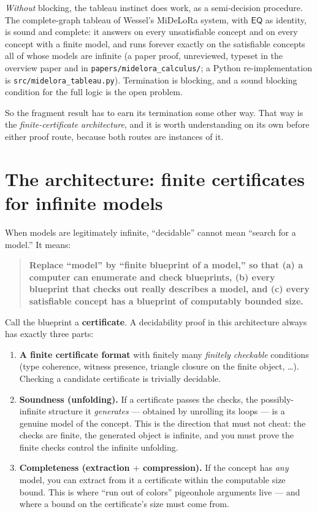 \documentclass[11pt]{article}
\newcommand{\EQ}{\ensuremath{\mathsf{EQ}}}
\newcommand{\code}[1]{\texttt{#1}}
\begin{document}
\emph{Without} blocking, the tableau instinct does work, as a semi-decision
procedure. The complete-graph tableau of Wessel's MiDeLoRa system, with $\EQ$
as identity, is sound and complete: it answers on every unsatisfiable concept
and on every concept with a finite model, and runs forever exactly on the
satisfiable concepts all of whose models are infinite (a paper proof,
unreviewed, typeset in the overview paper and in
\code{papers/midelora\_calculus/}; a Python re-implementation is
\code{src/midelora\_tableau.py}). Termination is blocking, and a sound
blocking condition for the full logic is the open problem.

So the fragment result has to earn its termination some other way. That
way is the \emph{finite-certificate architecture}, and it is worth
understanding on its own before either proof route, because both routes
are instances of it.

\section{The architecture: finite certificates for infinite
models}\label{sec:architecture}

When models are legitimately infinite, ``decidable'' cannot mean
``search for a model.'' It means:

\begin{quote}
\textbf{Replace ``model'' by ``finite blueprint of a model,'' so that
(a) a computer can enumerate and check blueprints, (b) every blueprint
that checks out really describes a model, and (c) every satisfiable
concept has a blueprint of computably bounded size.}
\end{quote}

Call the blueprint a \textbf{certificate}. A decidability proof in this
architecture always has exactly three parts:
\begin{enumerate}
\item \textbf{A finite certificate format} with finitely many
  \emph{finitely checkable} conditions (type coherence, witness
  presence, triangle closure on the finite object, \dots). Checking a
  candidate certificate is trivially decidable.
\item \textbf{Soundness (unfolding).} If a certificate passes the
  checks, the possibly-infinite structure it \emph{generates} ---
  obtained by unrolling its loops --- is a genuine model of the
  concept. This is the direction that must not cheat: the checks are
  finite, the generated object is infinite, and you must prove the
  finite checks control the infinite unfolding.
\item \textbf{Completeness (extraction $+$ compression).} If the
  concept has \emph{any} model, you can extract from it a certificate
  within the computable size bound. This is where ``run out of colors''
  pigeonhole arguments live --- and where a bound on the certificate's
  size must come from.
\end{enumerate}
\end{document}

